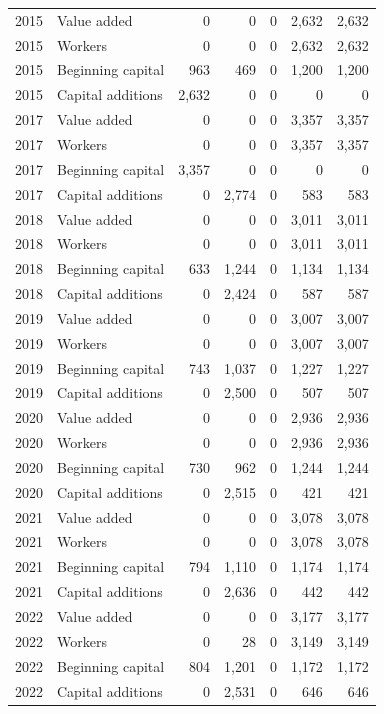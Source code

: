 \begin{longtable}{llrrrrr}
2015 & Value added & 0 & 0 & 0 & 2,632 & 2,632 \\
2015 & Workers & 0 & 0 & 0 & 2,632 & 2,632 \\
2015 & Beginning capital & 963 & 469 & 0 & 1,200 & 1,200 \\
2015 & Capital additions & 2,632 & 0 & 0 & 0 & 0 \\
2017 & Value added & 0 & 0 & 0 & 3,357 & 3,357 \\
2017 & Workers & 0 & 0 & 0 & 3,357 & 3,357 \\
2017 & Beginning capital & 3,357 & 0 & 0 & 0 & 0 \\
2017 & Capital additions & 0 & 2,774 & 0 & 583 & 583 \\
2018 & Value added & 0 & 0 & 0 & 3,011 & 3,011 \\
2018 & Workers & 0 & 0 & 0 & 3,011 & 3,011 \\
2018 & Beginning capital & 633 & 1,244 & 0 & 1,134 & 1,134 \\
2018 & Capital additions & 0 & 2,424 & 0 & 587 & 587 \\
2019 & Value added & 0 & 0 & 0 & 3,007 & 3,007 \\
2019 & Workers & 0 & 0 & 0 & 3,007 & 3,007 \\
2019 & Beginning capital & 743 & 1,037 & 0 & 1,227 & 1,227 \\
2019 & Capital additions & 0 & 2,500 & 0 & 507 & 507 \\
2020 & Value added & 0 & 0 & 0 & 2,936 & 2,936 \\
2020 & Workers & 0 & 0 & 0 & 2,936 & 2,936 \\
2020 & Beginning capital & 730 & 962 & 0 & 1,244 & 1,244 \\
2020 & Capital additions & 0 & 2,515 & 0 & 421 & 421 \\
2021 & Value added & 0 & 0 & 0 & 3,078 & 3,078 \\
2021 & Workers & 0 & 0 & 0 & 3,078 & 3,078 \\
2021 & Beginning capital & 794 & 1,110 & 0 & 1,174 & 1,174 \\
2021 & Capital additions & 0 & 2,636 & 0 & 442 & 442 \\
2022 & Value added & 0 & 0 & 0 & 3,177 & 3,177 \\
2022 & Workers & 0 & 28 & 0 & 3,149 & 3,149 \\
2022 & Beginning capital & 804 & 1,201 & 0 & 1,172 & 1,172 \\
2022 & Capital additions & 0 & 2,531 & 0 & 646 & 646 \\
\end{longtable}
\endgroup
{}
